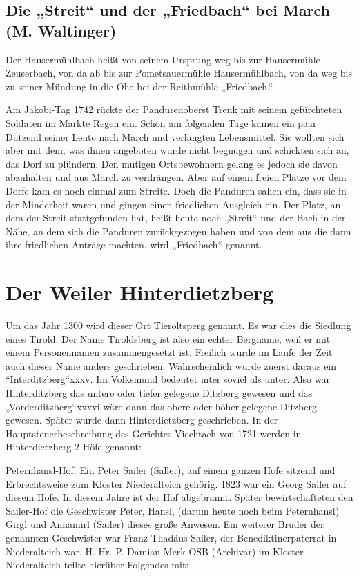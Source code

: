 \documentclass[12pt,a4pager]{book}
\begin{document}
\subsection{Die „Streit“ und der „Friedbach“ bei March (M. Waltinger)}

Der Hausermühlbach heißt von seinem Ursprung weg bis zur Hausermühle Zeuserbach,
von da ab bis zur Pometsauermühle Hausermühlbach, von da weg bis zu seiner
Mündung in die Ohe bei der Reithmühle „Friedbach.“

Am Jakobi-Tag 1742 rückte der Pandurenoberst Trenk mit seinem gefürchteten
Soldaten im Markte Regen ein. Schon am folgenden Tage kamen ein paar Dutzend
seiner Leute nach March und verlangten Lebensmittel. Sie wollten sich aber mit
dem, was ihnen angeboten wurde nicht begnügen und schickten sich an, das Dorf zu
plündern. Den mutigen Ortsbewohnern gelang es jedoch sie davon abzuhalten und
aus March zu verdrängen. Aber auf einem freien Platze vor dem Dorfe kam es noch
einmal zum Streite. Doch die Panduren sahen ein, dass sie in der Minderheit
waren und gingen einen friedlichen Ausgleich ein. Der Platz, an dem der Streit
stattgefunden hat, heißt heute noch „Streit“ und der Bach in der Nähe, an dem
sich die Panduren zurückgezogen haben und von dem aus die dann ihre friedlichen
Anträge machten, wird „Friedbach“ genannt.

\section{Der Weiler Hinterdietzberg}

Um das Jahr 1300 wird dieser Ort Tieroltsperg genannt. Es war dies die Siedlung
eines Tirold. Der Name Tiroldsberg ist also ein echter Bergname, weil er mit
einem Personennamen zusammengesetzt ist. Freilich wurde im Laufe der Zeit auch
dieser Name anders geschrieben. Wahrscheinlich wurde zuerst daraus ein
“Interditzberg“xxxv. Im Volksmund bedeutet inter soviel als unter. Also war
Hinterditzberg das untere oder tiefer gelegene Ditzberg gewesen und das
„Vorderditzberg“xxxvi wäre dann das obere oder höher gelegene Ditzberg gewesen.
Später wurde dann Hinterdietzberg geschrieben. In der Hauptsteuerbeschreibung
des Gerichtes Viechtach von 1721 werden in Hinterdietzberg 2 Höfe genannt:

Peternhansl-Hof: Ein Peter Sailer (Saller), auf einem ganzen Hofe sitzend und
Erbrechtsweise zum Kloster Niederalteich gehörig. 1823 war ein Georg Sailer auf
diesem Hofe. In diesem Jahre ist der Hof abgebrannt. Später bewirtschafteten den
Sailer-Hof die Geschwister Peter, Hansl, (darum heute noch beim Peternhansl)
Girgl und Annamirl (Sailer) dieses große Anwesen. Ein weiterer Bruder der
genannten Geschwister war Franz Thadäus Sailer, der Benediktinerpaterrat in
Niederalteich war. H. Hr. P. Damian Merk OSB (Archivar) im Kloster Niederalteich
teilte hierüber Folgendes mit:
\end{document}
